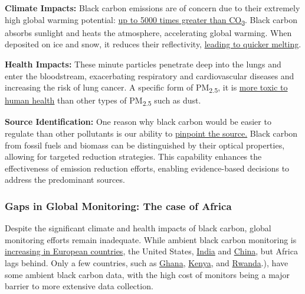 \documentclass[
  letterpaper,
  DIV=11,
  numbers=noendperiod]{scrartcl}
\begin{document}
\textbf{Climate Impacts:} Black carbon emissions are of concern due to
their extremely high global warming potential:
\href{https://en.wikipedia.org/wiki/Open_burning_of_waste}{up to 5000
times greater than CO\textsubscript{2}}. Black carbon absorbs sunlight
and heats the atmosphere, accelerating global warming. When deposited on
ice and snow, it reduces their reflectivity,
\href{https://www.ccacoalition.org/short-lived-climate-pollutants/black-carbon}{leading
to quicker melting}.

\textbf{Health Impacts:} These minute particles penetrate deep into the
lungs and enter the bloodstream, exacerbating respiratory and
cardiovascular diseases and increasing the risk of lung cancer. A
specific form of PM\textsubscript{2.5}, it is
\href{https://iris.who.int/bitstream/handle/10665/352615/9789289002653-eng.pdf?sequence=1}{more
toxic to human health} than other types of PM\textsubscript{2.5} such as
dust.

\textbf{Source Identification:} One reason why black carbon would be
easier to regulate than other pollutants is our ability to
\href{https://iris.who.int/bitstream/handle/10665/352615/9789289002653-eng.pdf?sequence=1}{pinpoint
the source.} Black carbon from fossil fuels and biomass can be
distinguished by their optical properties, allowing for targeted
reduction strategies. This capability enhances the effectiveness of
emission reduction efforts, enabling evidence-based decisions to address
the predominant sources.

\subsubsection{\texorpdfstring{\textbf{Gaps in Global Monitoring: The
case of
Africa}}{Gaps in Global Monitoring: The case of Africa}}\label{gaps-in-global-monitoring-the-case-of-africa}

Despite the significant climate and health impacts of black carbon,
global monitoring efforts remain inadequate. While ambient black carbon
monitoring is
\href{https://www.clarity.io/blog/air-quality-measurements-series-black-carbon}{increasing
in European countries}, the United States,
\href{https://mausam.imd.gov.in/imd_latest/contents/environmental-monitoring-services.php}{India}
and \href{https://www.mdpi.com/2073-4433/11/7/684}{China}, but Africa
lags behind. Only a few countries, such as
\href{https://www.sciencedirect.com/science/article/pii/S0048969723011981}{Ghana},
\href{https://www.nature.com/articles/s43247-022-00400-1}{Kenya}, and
\href{https://www.sciencedirect.com/science/article/abs/pii/S2212095522002309\#:~:text=Only\%20two\%20studies\%20of\%20BC,et\%20al.\%2C\%202020}{Rwanda}.),
have some ambient black carbon data, with the high cost of monitors
being a major barrier to more extensive data collection.
\end{document}
